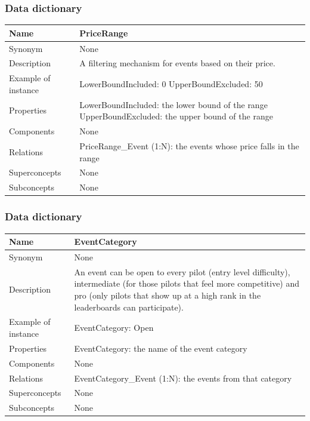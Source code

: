 \documentclass{beamer}
\begin{document}
\begin{frame}
    \frametitle{Data dictionary}
    \begin{table}
    \tiny
    \begin{tabular}{|p{2cm}|p{6cm}|}
    \hline
    Name & \textbf{PriceRange}  \\
    \hline
    Synonym & None \\
    \hline
    Description & A filtering mechanism for events based on their price. \\
    \hline
    Example of instance &
    LowerBoundIncluded: 0 \newline
    UpperBoundExcluded: 50 \\
    \hline
    Properties &
    LowerBoundIncluded: the lower bound of the range \newline
    UpperBoundExcluded: the upper bound of the range \\
    \hline
    Components & None \\
    \hline
    Relations &
    PriceRange\_Event (1:N): the events whose price falls in the range \\
    \hline
    Superconcepts & None \\
    \hline
    Subconcepts & None \\
    \hline
    \end{tabular}
    \end{table}
\end{frame}


\begin{frame}
    \frametitle{Data dictionary}
    \begin{table}
    \tiny
    \begin{tabular}{|p{2cm}|p{6cm}|}
    \hline
    Name & \textbf{EventCategory} \\
    \hline
    Synonym & None \\
    \hline
    Description & An event can be open to every pilot (entry level difficulty),
    intermediate (for those pilots that feel more competitive) and 
    pro (only pilots that show up at a high rank in the leaderboards can participate). \\
    \hline
    Example of instance &
    EventCategory: Open \\
    \hline
    Properties &
    EventCategory: the name of the event category \\
    \hline
    Components & None \\
    \hline
    Relations &
    EventCategory\_Event (1:N): the events from that category \\
    \hline
    Superconcepts & None \\
    \hline
    Subconcepts & None \\
    \hline
    \end{tabular}
    \end{table}
\end{frame}
\end{document}
